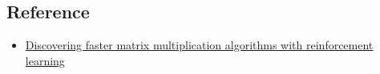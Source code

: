 \chapter{}


\section{Reference}
\begin{itemize}
    \item \href{}{Discovering faster matrix multiplication 
    algorithms with reinforcement learning}
\end{itemize}